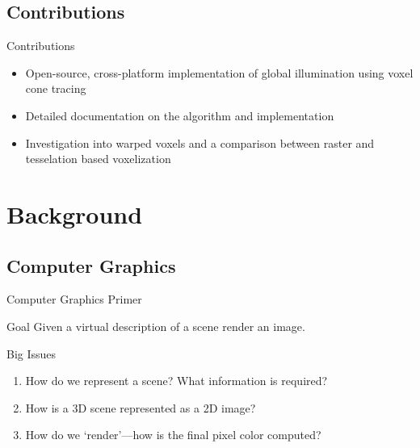 \documentclass[10pt]{beamer}
\begin{document}
\subsection{Contributions}
\begin{frame}{Contributions}
  \begin{itemize}
    \item Open-source, cross-platform implementation of global illumination using voxel cone tracing
    \item Detailed documentation on the algorithm and implementation %
    \item Investigation into warped voxels and a comparison between raster and tesselation based voxelization
  \end{itemize}
\end{frame}


\section{Background}

\subsection{Computer Graphics}
\begin{frame}{Computer Graphics Primer}
  \begin{block}{Goal}
    Given a virtual description of a scene render an image.
  \end{block}

  \begin{block}{Big Issues}
    \begin{enumerate}
      \item How do we represent a scene? What information is required?  %
      \item How is a 3D scene represented as a 2D image?  %
      \item How do we `render'---how is the final pixel color computed? %
    \end{enumerate}
  \end{block}
\end{frame}
\end{document}
